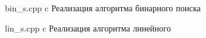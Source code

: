 \begin{appendices}
	\chapter{}
	{bin_s.cpp} %
	{c} %
	{Реализация алгоритма бинарного поиска} %
	
	{lin_s.cpp} %
	{c} %
	{Реализация алгоритма линейного} %
\end{appendices}
	
	
	